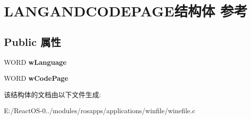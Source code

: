 \hypertarget{struct_l_a_n_g_a_n_d_c_o_d_e_p_a_g_e}{}\section{L\+A\+N\+G\+A\+N\+D\+C\+O\+D\+E\+P\+A\+G\+E结构体 参考}
\label{struct_l_a_n_g_a_n_d_c_o_d_e_p_a_g_e}
\subsection*{Public 属性}
\begin{DoxyCompactItemize}
\item 
\mbox{\label{struct_l_a_n_g_a_n_d_c_o_d_e_p_a_g_e_a273367296d4fde2df4def318246dbdb1}} 
W\+O\+RD {\bfseries w\+Language}
\item 
\mbox{\label{struct_l_a_n_g_a_n_d_c_o_d_e_p_a_g_e_af35dc2d33628ca1e055abd401cafbffb}} 
W\+O\+RD {\bfseries w\+Code\+Page}
\end{DoxyCompactItemize}


该结构体的文档由以下文件生成\+:\begin{DoxyCompactItemize}
\item 
E\+:/\+React\+O\+S-\/0../modules/rosapps/applications/winfile/winefile.\+c\end{DoxyCompactItemize}

